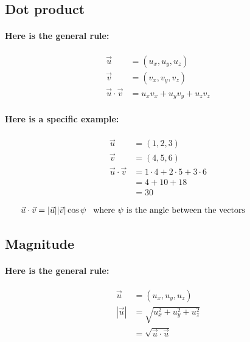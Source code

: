 \documentclass[twoside]{article}
\begin{document}
\subsection{Dot product}

\paragraph{Here is the general rule:}

\begin{align*}
  \vec{u} & = (u_x, u_y, u_z) \\
  \vec{v} & = (v_x, v_y, v_z) \\
  \vec{u} \cdot \vec{v} & = u_x v_x + u_y v_y + u_z v_z
  \end{align*}

\paragraph{Here is a specific example:}

\begin{align*}
  \vec{u} & = (1, 2, 3) \\
  \vec{v} & = (4, 5, 6) \\
  \vec{u} \cdot \vec{v} & = 1 \cdot 4 + 2 \cdot 5 + 3 \cdot 6 \\
                             & = 4 + 10 + 18 \\
                             & = 30
  \end{align*}

\begin{align*}
  \vec{u} \cdot \vec{v} & = |\vec{u}| |\vec{v}| \cos \psi \;\;\;
    \parbox{8cm}{where $\psi$ is the angle between the vectors}
  \end{align*}

\subsection{Magnitude}

\paragraph{Here is the general rule:}

\begin{align*}
  \vec{u} & = (u_x, u_y, u_z) \\
  |\vec{u}| & = \sqrt{ u_x^2 + u_y^2 + u_z^2} \\
             & = \sqrt{ \vec{u} \cdot \vec{u} }
  \end{align*}
\end{document}
